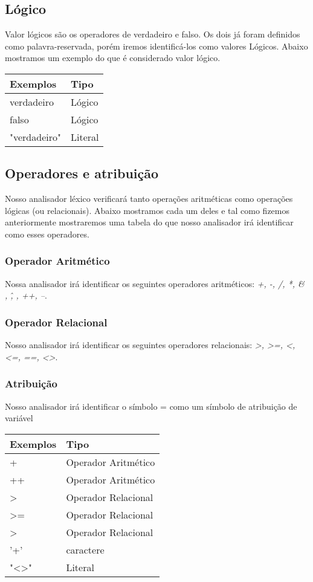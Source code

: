 \documentclass[
12pt,				%
a4paper,			%
english,			%
french,				%
spanish,			%
brazil,				%
article
]{abntex2}
\begin{document}
\subsection{Lógico}
Valor lógicos são os operadores de verdadeiro e falso. Os dois já foram definidos como palavra-reservada, porém iremos identificá-los como valores Lógicos. Abaixo mostramos um exemplo do que é considerado valor lógico.

\begin{center}
	\begin{tabular}{ll}
		\hline Exemplos & Tipo \\
		\hline verdadeiro & Lógico \\
		\hline falso & Lógico \\
		\hline "verdadeiro" & Literal \\
		\hline
	\end{tabular}
	\label{tab:}
\end{center}

\subsection{Operadores e atribuição}
Nosso analisador léxico verificará tanto operações aritméticas como operações lógicas (ou relacionais). Abaixo mostramos cada um deles e tal como fizemos anteriormente mostraremos uma tabela do que nosso analisador irá identificar como esses operadores.

\subsubsection{Operador Aritmético}
Nossa analisador irá identificar os seguintes operadores aritméticos: \textit{+, -, /, *, \& , \^, , ++, --}.

\subsubsection{Operador Relacional}
Nosso analisador irá identificar os seguintes operadores relacionais: \textit{>, >=, <, <=, ==, <>}.

\subsubsection{Atribuição}
Nosso analisador irá identificar o símbolo = como um símbolo de atribuição de variável

\begin{center}
	\begin{tabular}{ll}
		\hline Exemplos & Tipo \\
		\hline + &  Operador Aritmético \\
		\hline ++ & Operador Aritmético \\
		\hline > & Operador Relacional \\
		\hline >= & Operador Relacional \\
		\hline > & Operador Relacional \\
		\hline '+' & caractere \\
		\hline "<>" & Literal \\			
		\hline
	\end{tabular}
	\label{tab:}
\end{center}
\end{document}
